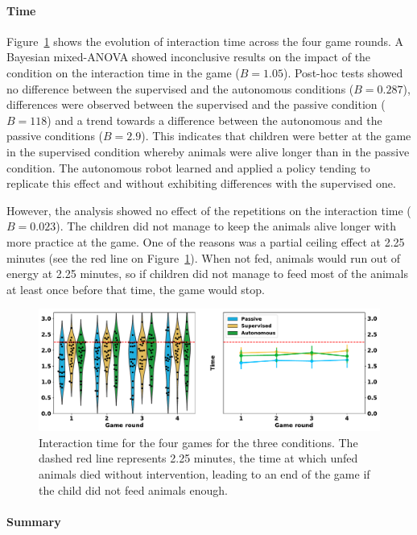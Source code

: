 \paragraph{Time}

Figure~\ref{fig:tutoring_time} shows the evolution of interaction time across the four game rounds. A Bayesian mixed-ANOVA showed inconclusive results on the impact of the condition on the interaction time in the game ($B=1.05$). Post-hoc tests showed no difference between the supervised and the autonomous conditions ($B=0.287$), differences were observed between the supervised and the passive condition ($B=118$) and a trend towards a difference between the autonomous and the passive conditions ($B=2.9$). This indicates that children were better at the game in the supervised condition whereby animals were alive longer than in the passive condition. The autonomous robot learned and applied a policy tending to replicate this effect and without exhibiting differences with the supervised one.

However, the analysis showed no effect of the repetitions on the interaction time ($B=0.023$). The children did not manage to keep the animals alive longer with more practice at the game. One of the reasons was a partial ceiling effect at 2.25 minutes (see the red line on Figure~\ref{fig:tutoring_time}). When not fed, animals would run out of energy at 2.25 minutes, so if children did not manage to feed most of the animals at least once before that time, the game would stop. 

\begin{figure}[ht]
	\includegraphics[width=1\linewidth]{time.pdf}
	\centering
	\caption{Interaction time for the four games for the three conditions. The dashed red line represents 2.25 minutes, the time at which unfed animals died without intervention, leading to an end of the game if the child did not feed animals enough.}
	\label{fig:tutoring_time}
\end{figure}


\paragraph{Summary}

